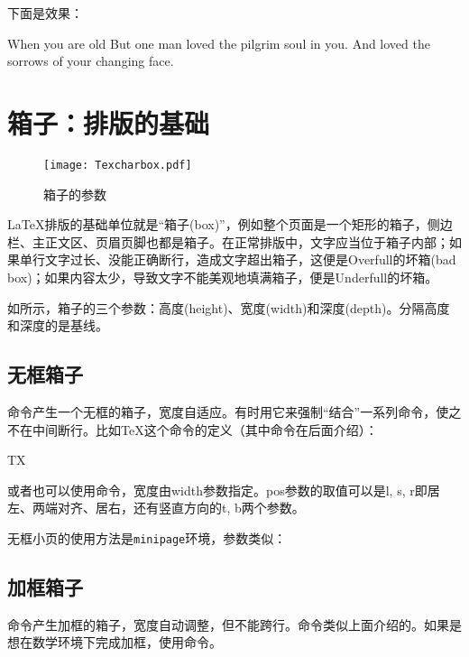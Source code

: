 下面是效果：
\begin{codeshow}
\begin{QuoteEnv}{When you are old}
But one man loved the pilgrim soul in you.
And loved the sorrows of your changing face.
\end{QuoteEnv}
\end{codeshow}

\section{箱子：排版的基础}
\label{sec:box}

\begin{wrapfigure}{R}{0.4\textwidth}
\texttt{[image: Texcharbox.pdf]}
\caption{箱子的参数}
\label{fig:boxpara}
\end{wrapfigure}

\LaTeX 排版的基础单位就是“箱子(box)”，例如整个页面是一个矩形的箱子，侧边栏、主正文区、页眉页脚也都是箱子。在正常排版中，文字应当位于箱子内部；如果单行文字过长、没能正确断行，造成文字超出箱子，这便是Overfull的坏箱(bad box)；如果内容太少，导致文字不能美观地填满箱子，便是Underfull的坏箱。

如所示，箱子的三个参数：高度(height)、宽度(width)和深度(depth)。分隔高度和深度的是基线。

\subsection{无框箱子}
命令产生一个无框的箱子，宽度自适应。有时用它来强制“结合”一系列命令，使之不在中间断行。比如\TeX 这个命令的定义（其中命令在后面介绍）：
\begin{latex}
\mbox{T\hspace{-0.1667em}\raisebox{-0.5ex}{E}\hspace{-0.125em}X}
\end{latex}

或者也可以使用命令，宽度由width参数指定。pos参数的取值可以是l, s, r即居左、两端对齐、居右，还有竖直方向的t, b两个参数。

无框小页的使用方法是\texttt{minipage}环境，参数类似：

\subsection{加框箱子}
命令产生加框的箱子，宽度自动调整，但不能跨行。命令类似上面介绍的。如果是想在数学环境下完成加框，使用命令。

